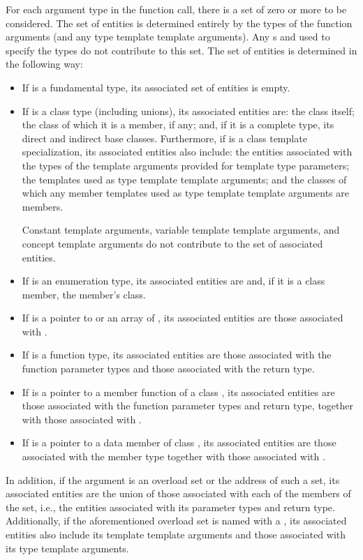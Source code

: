 \pnum
For each argument type  in the function call,
there is a set of zero or more 
to be considered.
The set of entities is determined entirely by
the types of the function arguments
(and any type template template arguments).
Any s and 
used to specify the types
do not contribute to this set.
The set of entities
is determined in the following way:
\begin{itemize}
\item If  is a fundamental type, its associated set of
entities is empty.

\item If  is a class type (including unions),
its associated entities are:
the class itself;
the class of which it is a member, if any;
and, if it is a complete type, its direct and indirect base classes.
Furthermore, if  is a class template specialization,
its associated entities also include:
the entities
associated with the types of the template arguments
provided for template type parameters;
the templates used as type template template arguments; and
the classes of which any member templates used as type template template
arguments are members.
\begin{note}
Constant template arguments,
variable template template arguments, and
concept template arguments
do not
contribute to the set of associated entities.
\end{note}

\item If  is an enumeration type,
its associated entities are 
and, if it is a class member, the member's class.

\item If  is a pointer to  or an array of ,
its associated entities are those associated with .

\item If  is a function type, its associated
entities are those associated with the function parameter types and those
associated with the return type.

\item If  is a pointer to a member function of a class
, its associated entities are those associated
with the function parameter types and return type, together with those
associated with .

\item If  is a pointer to a data member of class , its
associated entities are those associated with the member
type together with those associated with .
\end{itemize}
In addition, if the argument is an overload set or the address of such a set,
its associated entities
are the union of those associated with each of the
members of the set, i.e., the entities associated with its
parameter types and return type.
Additionally, if the aforementioned overload set is named with
a , its associated entities also include
its template template arguments and
those associated with its type template arguments.

